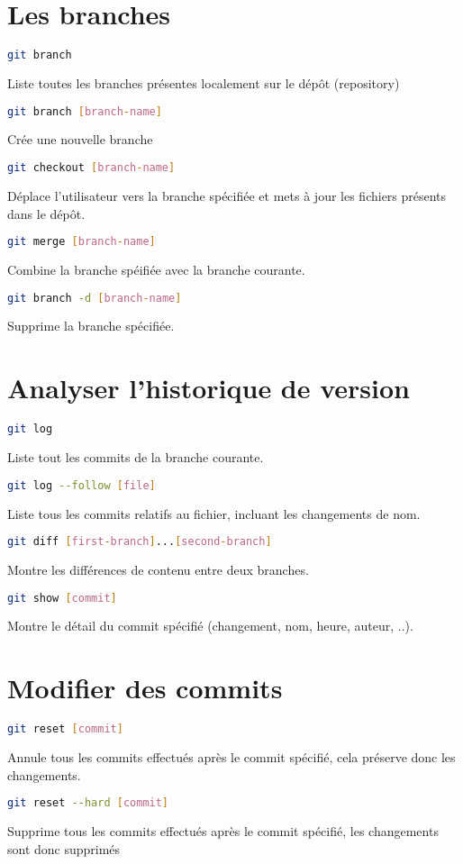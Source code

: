 \documentclass[10pt,landscape]{article}
\begin{document}
\begin{multicols}{3}
\section{Les branches}
\begin{lstlisting}[language=bash]
git branch
\end{lstlisting}
Liste toutes les branches présentes localement sur le dépôt (repository)
\begin{lstlisting}[language=bash]
git branch [branch-name]
\end{lstlisting}
Crée une nouvelle branche
\begin{lstlisting}[language=bash]
git checkout [branch-name]
\end{lstlisting}
Déplace l'utilisateur vers la branche spécifiée et mets à jour les fichiers présents dans le dépôt.
\begin{lstlisting}[language=bash]
git merge [branch-name]
\end{lstlisting}
Combine la branche spéifiée avec la branche courante.
\begin{lstlisting}[language=bash]
git branch -d [branch-name]
\end{lstlisting}
Supprime la branche spécifiée.

\section{Analyser l'historique de version}
\begin{lstlisting}[language=bash]
git log
\end{lstlisting}
Liste tout les commits de la branche courante.
\begin{lstlisting}[language=bash]
git log --follow [file]
\end{lstlisting}
Liste tous les commits relatifs au fichier, incluant les changements de nom.
\begin{lstlisting}[language=bash]
git diff [first-branch]...[second-branch]
\end{lstlisting}
Montre les différences de contenu entre deux branches.
\begin{lstlisting}[language=bash]
git show [commit]
\end{lstlisting}
Montre le détail du commit spécifié (changement, nom, heure, auteur, ..).

\section{Modifier des commits}
\begin{lstlisting}[language=bash]
git reset [commit]
\end{lstlisting}
Annule tous les commits effectués après le commit spécifié, cela préserve donc les changements.
\begin{lstlisting}[language=bash]
git reset --hard [commit]
\end{lstlisting}
Supprime tous les commits effectués après le commit spécifié, les changements sont donc supprimés


\end{multicols}
\end{document}
